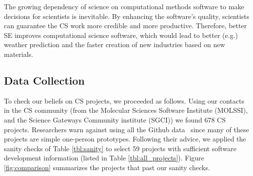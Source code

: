 \documentclass[sigconf,review,anonymous]{acmart}
\begin{document}
The growing dependency of science on computational methods software to make decisions for scientists is inevitable. By enhancing the software's quality, scientists can guarantee the CS work more credible and more productive. Therefore, 
better SE improves computational
science software, which would lead to better (e.g.) weather  prediction and the faster creation of new industries based on new materials.


 


 


\subsection{Data Collection}

To check our beliefs on CS projects, we proceeded as follows. 
Using our contacts in the CS community
(from the Molecular Sciences Software Institute (MOLSSI), and the Science Gateways Community institute (SGCI)) we found
678 CS  projects.
Researchers
warn against using all the Github data~\cite{bird09promise,agrawal2018we, eirini15promise, munaiah17curating} since
many of these projects are simple one-person prototypes.
Following  their advice, we applied the sanity checks of Table \ref{tbl:sanity}
to select 59  projects with sufficient software development information 
(listed in Table \ref{tbl:all_projects}). Figure \ref{fig:comparison} summarizes the projects that past our sanity checks.
 
\end{document}
